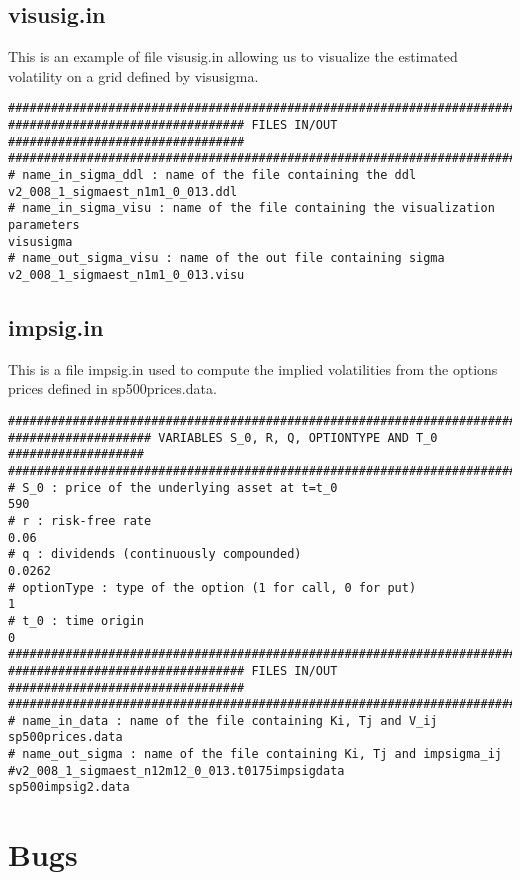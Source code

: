 \documentclass[12pt]{article}
\begin{document}
\subsection{visusig.in}

This is an example of file visusig.in allowing us to visualize the 
estimated volatility on a grid defined by visusigma.

\begin{verbatim}
################################################################################
################################# FILES IN/OUT #################################
################################################################################
# name_in_sigma_ddl : name of the file containing the ddl
v2_008_1_sigmaest_n1m1_0_013.ddl
# name_in_sigma_visu : name of the file containing the visualization parameters
visusigma
# name_out_sigma_visu : name of the out file containing sigma 
v2_008_1_sigmaest_n1m1_0_013.visu

\end{verbatim}

\subsection{impsig.in}

This is a file impsig.in used to compute the implied volatilities from 
the options prices defined in sp500prices.data.

\begin{verbatim}
################################################################################
#################### VARIABLES S_0, R, Q, OPTIONTYPE AND T_0 ###################
################################################################################
# S_0 : price of the underlying asset at t=t_0
590
# r : risk-free rate     
0.06
# q : dividends (continuously compounded) 
0.0262
# optionType : type of the option (1 for call, 0 for put)  
1
# t_0 : time origin
0
################################################################################
################################# FILES IN/OUT #################################
################################################################################
# name_in_data : name of the file containing Ki, Tj and V_ij
sp500prices.data
# name_out_sigma : name of the file containing Ki, Tj and impsigma_ij
#v2_008_1_sigmaest_n12m12_0_013.t0175impsigdata
sp500impsig2.data
\end{verbatim}

\section{Bugs}
\end{document}
